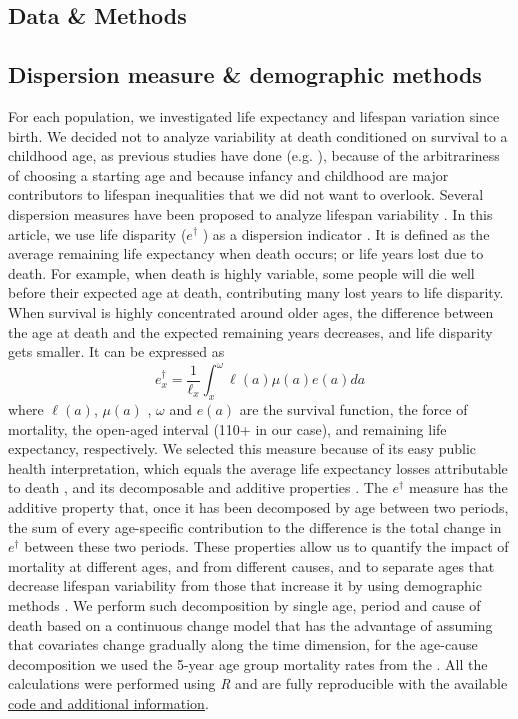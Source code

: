 \documentclass{article}
\begin{document}
\begin{spacing}{1.5}
\section*{Data \& Methods}

\subsection*{Dispersion measure \& demographic methods}

For each population, we investigated life expectancy and lifespan variation since birth. We decided not to analyze variability at death conditioned on survival to a childhood age, as previous studies have done (e.g. \citet{edwards2005, smits2009}), because of the arbitrariness of choosing a starting age and because infancy and childhood are major contributors to lifespan inequalities that we did not want to overlook. 
Several dispersion measures have been proposed to analyze lifespan variability \citep{vanraalte2013, wilmoth1999}. In this article, we use life disparity ($e^{\dagger}$ ) as a dispersion indicator \citep{vaupel&Canudas2003}. It is defined as the average remaining life expectancy when death occurs; or life years lost due to death.  For example, when death is highly variable, some people will die well before their expected age at death, contributing many lost years to life disparity. When survival is highly concentrated around older ages, the difference between the age at death and the expected remaining years decreases, and life disparity gets smaller.  It can be expressed as
\begin{equation}
\label{eq.edagger}
e_x^{\dagger}=\frac{1}{\ell_x}\int_x^\omega \ell(a) \mu(a)e(a)da
\end{equation}
where $\ell(a)$, $\mu(a)$ , $\omega$ and $e(a)$ are the survival function, the force of mortality, the open-aged interval (110+ in our case), and remaining life expectancy, respectively. 
We selected this measure because of its easy public health interpretation, which equals the average life expectancy losses attributable to death \citep{shkolnikov2011}, and its decomposable and additive properties \citep{zhang2009}. The $e^\dagger$ measure has the additive property that, once it has been decomposed by age between two periods, the sum of every age-specific contribution to the difference is the total change in $e^\dagger$ between these two periods. These properties allow us to quantify the impact of mortality at different ages, and from different causes, and to separate ages that decrease lifespan variability from those that increase it by using demographic methods \citep{zhang2009, shkolnikov2011}. We perform such decomposition by single age, period and cause of death based on a continuous change model \citep{horiuchi2008} that has the advantage of assuming that covariates change gradually along the time dimension, for the age-cause decomposition we used the 5-year age group mortality rates from the \cite{HcO}. All the calculations were performed using \textit{R} \citep{team2000r} and are fully reproducible with the available \href{https://goo.gl/YhEgix}{code and additional information}.\\


\end{spacing}
\end{document}
